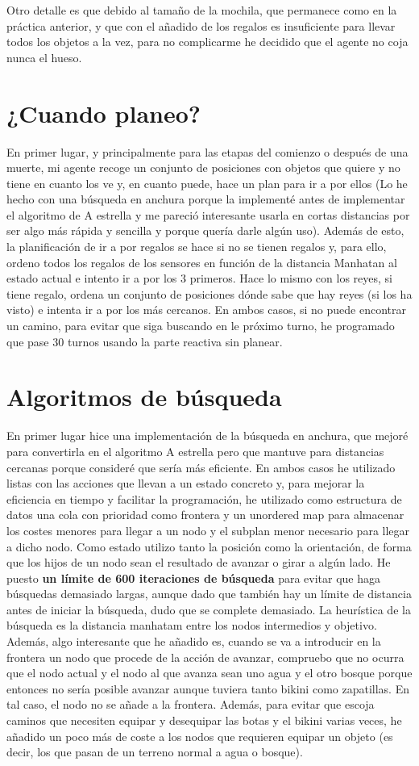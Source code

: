 \documentclass[a4paper, 11pt]{article}
\begin{document}
Otro detalle es que debido al tamaño de la mochila, que permanece como en la práctica anterior, y que con el añadido de los regalos es insuficiente para llevar todos los objetos a la vez, para no complicarme he decidido que el agente no coja nunca el hueso.

\section{¿Cuando planeo?}
En primer lugar, y principalmente para las etapas del comienzo o después de una muerte, mi agente recoge un conjunto de posiciones con objetos que quiere y no tiene en cuanto los ve y, en cuanto puede, hace un plan para ir a por ellos (Lo he hecho con una búsqueda en anchura porque la implementé antes de implementar el algoritmo de A estrella y me pareció interesante usarla en cortas distancias por ser algo más rápida y sencilla y porque quería darle algún uso). Además de esto, la planificación de ir a por regalos se hace si no se tienen regalos y, para ello, ordeno todos los regalos de los sensores en función de la distancia Manhatan al estado actual e intento ir a por los 3 primeros. Hace lo mismo con los reyes, si tiene regalo, ordena un conjunto de posiciones dónde sabe que hay reyes (si los ha visto) e intenta ir a por los más cercanos. En ambos casos, si no puede encontrar un camino, para evitar que siga buscando en le próximo turno, he programado que pase 30 turnos usando la parte reactiva sin planear.
\section{Algoritmos de búsqueda}
En primer lugar hice una implementación de la búsqueda en anchura, que mejoré para convertirla en el algoritmo A estrella pero que mantuve para distancias cercanas porque consideré que sería más eficiente. En ambos casos he utilizado listas con las acciones que llevan a un estado concreto y, para mejorar la eficiencia en tiempo y facilitar la programación, he utilizado como estructura de datos una cola con prioridad como frontera y un unordered map para almacenar los costes menores para llegar a un nodo y el subplan menor necesario para llegar a dicho nodo. Como estado utilizo tanto la posición como la orientación, de forma que los hijos de un nodo sean el resultado de avanzar o girar a algún lado. He puesto \textbf{un límite de 600 iteraciones de búsqueda} para evitar que haga búsquedas demasiado largas, aunque dado que también hay un límite de distancia antes de iniciar la búsqueda, dudo que se complete demasiado.
La heurística de la búsqueda es la distancia manhatam entre los nodos intermedios y objetivo. Además, algo interesante que he añadido es, cuando se va a introducir en la frontera un nodo que procede de la acción de avanzar, compruebo que no ocurra que el nodo actual y el nodo al que avanza sean uno agua y el otro bosque porque entonces no sería posible avanzar aunque tuviera tanto bikini como zapatillas. En tal caso, el nodo no se añade a la frontera. Además, para evitar que escoja caminos que necesiten equipar y desequipar las botas y el bikini varias veces, he añadido un poco más de coste a los nodos que requieren equipar un objeto (es decir, los que pasan de un terreno normal a agua o bosque).
\end{document}
